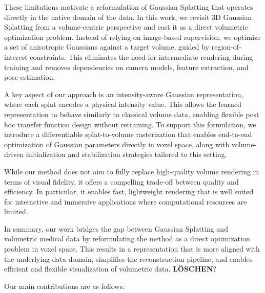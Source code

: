 \documentclass[runningheads]{llncs}
\begin{document}
These limitations motivate a reformulation of Gaussian Splatting that operates directly in the native domain of the data. In this work, we revisit 3D Gaussian Splatting from a volume-centric perspective and cast it as a direct volumetric optimization problem. Instead of relying on image-based supervision, we optimize a set of anisotropic Gaussians against a target volume, guided by region-of-interest constraints. This eliminates the need for intermediate rendering during training and removes dependencies on camera models, feature extraction, and pose estimation.

A key aspect of our approach is an intensity-aware Gaussian representation, where each splat encodes a physical intensity value. This allows the learned representation to behave similarly to classical volume data, enabling flexible post hoc transfer function design without retraining. To support this formulation, we introduce a differentiable splat-to-volume rasterization that enables end-to-end optimization of Gaussian parameters directly in voxel space, along with volume-driven initialization and stabilization strategies tailored to this setting.

While our method does not aim to fully replace high-quality volume rendering in terms of visual fidelity, it offers a compelling trade-off between quality and efficiency. In particular, it enables fast, lightweight rendering that is well suited for interactive and immersive applications where computational resources are limited.

In summary, our work bridges the gap between Gaussian Splatting and volumetric medical data by reformulating the method as a direct optimization problem in voxel space. This results in a representation that is more aligned with the underlying data domain, simplifies the reconstruction pipeline, and enables efficient and flexible visualization of volumetric data. \textbf{LÖSCHEN}?

Our main contributions are as follows:
\end{document}
